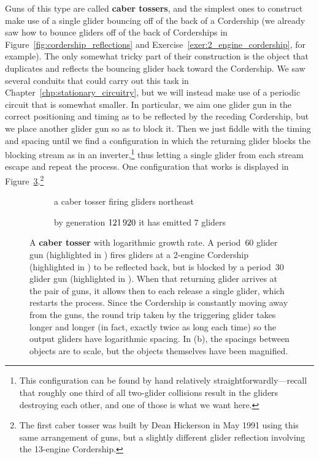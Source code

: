 Guns of this type are called \textbf{caber tossers}, and the simplest ones to construct make use of a single glider bouncing off of the back of a Cordership (we already saw how to bounce gliders off of the back of Corderships in Figure~\ref{fig:cordership_reflections} and Exercise~\ref{exer:2_engine_cordership}, for example). The only somewhat tricky part of their construction is the object that duplicates and reflects the bouncing glider back toward the Cordership. We saw several conduits that could carry out this task in Chapter~\ref{chp:stationary_circuitry}, but we will instead make use of a periodic circuit that is somewhat smaller. In particular, we aim one glider gun in the correct positioning and timing as to be reflected by the receding Cordership, but we place another glider gun so as to block it. Then we just fiddle with the timing and spacing until we find a configuration in which the returning glider blocks the blocking stream as in an inverter,\footnote{This configuration can be found by hand relatively straightforwardly---recall that roughly one third of all two-glider collisions result in the gliders destroying each other, and one of those is what we want here.} thus letting a single glider from each stream escape and repeat the process. One configuration that works is displayed in Figure~\ref{fig:caber_tosser}.\footnote{The first caber tosser was built by Dean Hickerson in May 1991 using this same arrangement of guns, but a slightly different glider reflection involving the 13-engine Cordership.}

\begin{figure}[!htb]
	\centering
	\begin{subfigure}{.51\textwidth}
		\centering
		\caption{a caber tosser firing gliders northeast}
		\label{fig:caber_tosser_0}
	\end{subfigure} \hfill \begin{subfigure}{.46\textwidth}
		\centering
		\caption{by generation $121{\,}920$ it has emitted $7$ gliders}
		\label{fig:caber_tosser_121920}
	\end{subfigure}
	\caption{A \textbf{caber tosser} with logarithmic growth rate. A period~$60$ glider gun (highlighted in ) fires gliders at a 2-engine Cordership (highlighted in ) to be reflected back, but is blocked by a period~$30$ glider gun (highlighted in ). When that returning glider arrives at the pair of guns, it allows then to each release a single glider, which restarts the process. Since the Cordership is constantly moving away from the guns, the round trip taken by the triggering glider takes longer and longer (in fact, exactly twice as long each time) so the output gliders have logarithmic spacing. In (b), the spacings between objects are to scale, but the objects themselves have been magnified.}
	\label{fig:caber_tosser}
\end{figure}

